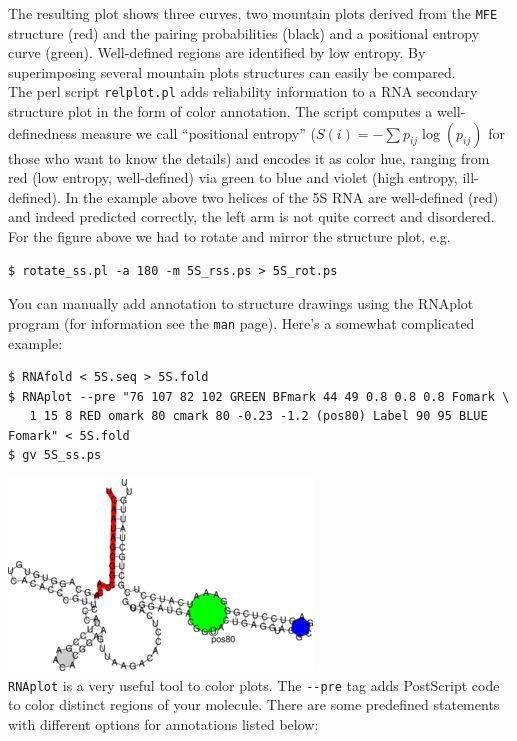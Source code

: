 \documentclass[]{article}
\begin{document}
The resulting plot shows three curves, two mountain plots derived from
the \texttt{MFE} structure (red) and the pairing probabilities (black)
and a positional entropy curve (green). Well-defined regions are
identified by low entropy. By superimposing several mountain plots
structures can easily be compared.\\
 The perl script \texttt{relplot.pl} adds reliability information to a
RNA secondary structure plot in the form of color annotation. The script
computes a well-definedness measure we call ``positional entropy''
(\(S\left( i \right) = - \sum p_{ij}\log\left( p_{ij} \right)\) for
those who want to know the details) and encodes it as color hue, ranging
from red (low entropy, well-defined) via green to blue and violet (high
entropy, ill-defined). In the example above two helices of the 5S RNA are
well-defined (red) and indeed predicted correctly, the left arm is not
quite correct and disordered.\\
For the figure above we had to rotate and mirror the structure plot, e.g.

\begin{verbatim}
$ rotate_ss.pl -a 180 -m 5S_rss.ps > 5S_rot.ps
\end{verbatim}

You can manually add annotation to structure drawings using the RNAplot
program (for information see the \texttt{man} page). Here's a somewhat
complicated example:

\begin{verbatim}
$ RNAfold < 5S.seq > 5S.fold
$ RNAplot --pre "76 107 82 102 GREEN BFmark 44 49 0.8 0.8 0.8 Fomark \
   1 15 8 RED omark 80 cmark 80 -0.23 -1.2 (pos80) Label 90 95 BLUE Fomark" < 5S.fold
$ gv 5S_ss.ps
\end{verbatim}

\includegraphics{Figs/5S_ss.png}\\

\texttt{RNAplot} is a very useful tool to color plots. The
\texttt{-\/-pre} tag adds PostScript code to color distinct regions of
your molecule. There are some predefined statements with different options
for annotations listed below:
\end{document}
